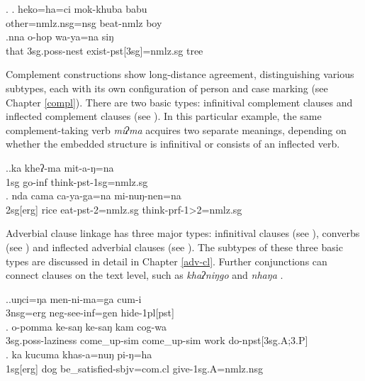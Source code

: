 \ex. \ag.   heko=ha=ci mok-khuba babu\\
			other{\sc =nmlz.nsg=nsg} beat{\sc -nmlz} boy\\
\bg.nna  o-hop wa-ya=na siŋ\\
		that {\sc 3sg.poss}-nest exist-{\sc pst[3sg]=nmlz.sg} tree\\
	

Complement constructions show long-distance agreement, distinguishing various subtypes, each with its own configuration of person  and case marking (see Chapter \ref{compl}). There are two basic types: infinitival complement clauses and inflected complement clauses (see \Next). In this particular example, the same complement-taking verb \emph{miʔma} acquires two separate meanings, depending on whether the embedded structure is infinitival or consists of an inflected verb.

\ex.\ag.ka kheʔ-ma mit-a-ŋ=na\\
{\sc 1sg} go{\sc -inf} think{\sc -pst-1sg=nmlz.sg}\\
\bg. nda cama ca-ya-ga=na mi-nuŋ-nen=na\\
{\sc 2sg[erg]} rice eat-{\sc pst-2=nmlz.sg} think-{\sc prf-1>2=nmlz.sg}\\


Adverbial clause linkage has three major types: infinitival clauses (see \Next[a]), converbs (see \Next[b]) and inflected adverbial clauses (see \Next[c]). The subtypes of these three basic types are discussed in detail in Chapter \ref{adv-cl}. Further conjunctions can connect clauses on the text level, such as \emph{khaʔniŋgo}  and \emph{nhaŋa} .

\ex.\ag.uŋci=ŋa men-ni-ma=ga cum-i\\
{\sc 3nsg=erg} {\sc neg-}see{\sc -inf=gen} hide{\sc -1pl[pst]}\\
\bg.	o-pomma ke-saŋ ke-saŋ kam cog-wa\\
	{\sc 3sg.poss-}laziness come\_up-{\sc sim} come\_up-{\sc sim} work do{\sc -npst[3sg.A;3.P]}\\
\bg. ka kucuma khas-a=nuŋ pi-ŋ=ha\\
{\sc 1sg[erg]} dog   be\_satisfied{\sc [3sg]-sbjv=com.cl} give{\sc [pst;3.P]-1sg.A=nmlz.nsg}\\





